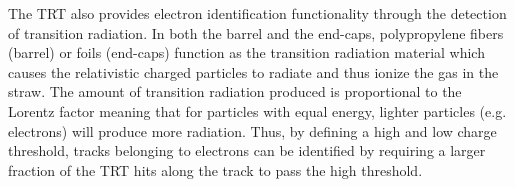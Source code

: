 The TRT also provides electron identification functionality through the
detection of transition radiation.  In both the barrel and the end-caps,
polypropylene fibers (barrel) or foils (end-caps) function as the transition
radiation material which causes the relativistic charged particles to radiate
and thus ionize the gas in the straw.  The amount of transition radiation
produced is proportional to the Lorentz factor meaning that for particles with
equal energy, lighter particles (e.g. electrons) will produce more radiation.
Thus, by defining a high and low charge threshold, tracks belonging to
electrons can be identified by requiring a larger fraction of the TRT hits
along the track to pass the high threshold.
